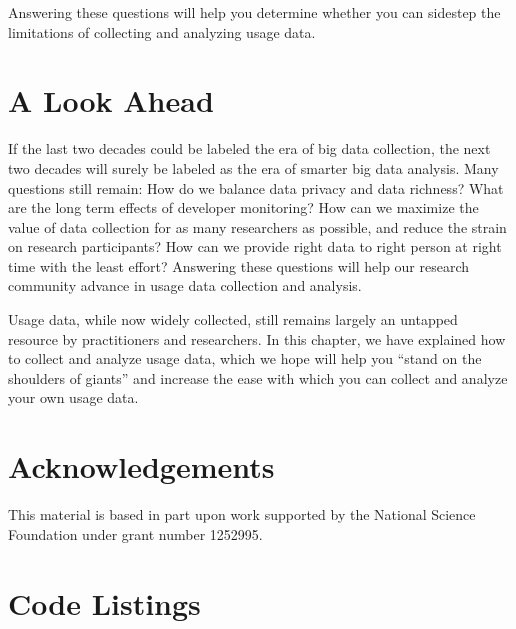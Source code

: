 \documentclass{book}
\begin{document}
\noindent
Answering these questions will help you determine whether you can sidestep
the limitations of collecting and analyzing usage data.

\section{A Look Ahead}

If the last two decades could be labeled the era
of big data collection,
the next two decades will surely be labeled as the
era of smarter big data analysis.
Many questions still remain:
How do we balance data privacy and data richness?
What are the long term effects of developer monitoring?
How can we maximize the value of data collection
for as many researchers as possible, and reduce the
strain on research participants? How can we provide right data to right person at right time with the least effort?
Answering these questions will help our research
community advance in usage data collection and analysis.

Usage data, while now widely collected, still remains largely
an untapped resource by practitioners and researchers.
In this chapter, we have explained how to collect and
analyze usage data, which we hope will help you ``stand
on the shoulders of giants'' and increase the ease
with which you can collect and analyze your own usage data.


\section{Acknowledgements}

This material is based in part upon work supported by the National 
Science Foundation under grant number 1252995.

\section{Code Listings}



 
\end{document}
